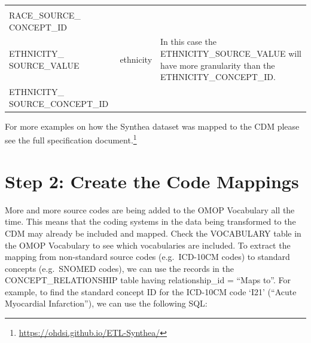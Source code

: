 \documentclass[11pt]{book}
\let\rmarkdownfootnote\footnote%
\def\footnote{\protect\rmarkdownfootnote}
\theoremstyle{definition}
\theoremstyle{definition}
\theoremstyle{definition}
\theoremstyle{remark}
\begin{document}
\begin{longtable}[]{@{}lll@{}}
\begin{minipage}[t]{0.50\columnwidth}
\strut
\end{minipage}\tabularnewline
\begin{minipage}[t]{0.28\columnwidth}\raggedright\strut
RACE\_SOURCE\_ CONCEPT\_ID\strut
\end{minipage} & \begin{minipage}[t]{0.13\columnwidth}\raggedright\strut
\strut
\end{minipage} & \begin{minipage}[t]{0.50\columnwidth}\raggedright\strut
\strut
\end{minipage}\tabularnewline
\begin{minipage}[t]{0.28\columnwidth}\raggedright\strut
ETHNICITY\_ SOURCE\_VALUE\strut
\end{minipage} & \begin{minipage}[t]{0.13\columnwidth}\raggedright\strut
ethnicity\strut
\end{minipage} & \begin{minipage}[t]{0.50\columnwidth}\raggedright\strut
In this case the ETHNICITY\_SOURCE\_VALUE will have more granularity
than the ETHNICITY\_CONCEPT\_ID.\strut
\end{minipage}\tabularnewline
\begin{minipage}[t]{0.28\columnwidth}\raggedright\strut
ETHNICITY\_ SOURCE\_CONCEPT\_ID\strut
\end{minipage} & \begin{minipage}[t]{0.13\columnwidth}\raggedright\strut
\strut
\end{minipage} & \begin{minipage}[t]{0.50\columnwidth}\raggedright\strut
\strut
\end{minipage}\tabularnewline
\bottomrule
\end{longtable}

For more examples on how the Synthea dataset was mapped to the CDM
please see the full specification document.\footnote{\url{https://ohdsi.github.io/ETL-Synthea/}}

\section{Step 2: Create the Code
Mappings}\label{step-2-create-the-code-mappings}

More and more source codes are being added to the OMOP Vocabulary all
the time. This means that the coding systems in the data being
transformed to the CDM may already be included and mapped. Check the
VOCABULARY table in the OMOP Vocabulary to see which vocabularies are
included. To extract the mapping from non-standard source codes
(e.g.~ICD-10CM codes) to standard concepts (e.g.~SNOMED codes), we can
use the records in the CONCEPT\_RELATIONSHIP table having
relationship\_id = ``Maps to''. For example, to find the standard
concept ID for the ICD-10CM code `I21' (``Acute Myocardial
Infarction''), we can use the following SQL:
\end{document}
